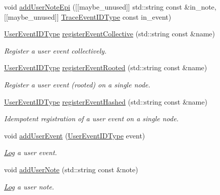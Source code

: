 \begin{DoxyCompactItemize}
\item 
void \hyperlink{namespacevt_1_1trace_adf857bfe26769050d0a5d484bfac2c37}{add\+User\+Note\+Epi} (\mbox{[}\mbox{[}maybe\+\_\+unused\mbox{]}\mbox{]} std\+::string const \&in\+\_\+note, \mbox{[}\mbox{[}maybe\+\_\+unused\mbox{]}\mbox{]} \hyperlink{namespacevt_1_1trace_a64a7185f3e102df8d8258f263ccd1582}{Trace\+Event\+I\+D\+Type} const in\+\_\+event)
\item 
\hyperlink{namespacevt_1_1trace_a5908920d051c144c89f17c69ed262350}{User\+Event\+I\+D\+Type} \hyperlink{namespacevt_1_1trace_a91e24c3e4f4145f8178050065befeda6}{register\+Event\+Collective} (std\+::string const \&name)
\begin{DoxyCompactList}\small\item\em Register a user event collectively. \end{DoxyCompactList}\item 
\hyperlink{namespacevt_1_1trace_a5908920d051c144c89f17c69ed262350}{User\+Event\+I\+D\+Type} \hyperlink{namespacevt_1_1trace_ab2627c07d28361b471d0b9008de2f20c}{register\+Event\+Rooted} (std\+::string const \&name)
\begin{DoxyCompactList}\small\item\em Register a user event (rooted) on a single node. \end{DoxyCompactList}\item 
\hyperlink{namespacevt_1_1trace_a5908920d051c144c89f17c69ed262350}{User\+Event\+I\+D\+Type} \hyperlink{namespacevt_1_1trace_a9d0309860e6216c541fe5c3af74a5426}{register\+Event\+Hashed} (std\+::string const \&name)
\begin{DoxyCompactList}\small\item\em Idempotent registration of a user event on a single node. \end{DoxyCompactList}\item 
void \hyperlink{namespacevt_1_1trace_ac973a9573bd3cc0a3fead674a4551ac5}{add\+User\+Event} (\hyperlink{namespacevt_1_1trace_a5908920d051c144c89f17c69ed262350}{User\+Event\+I\+D\+Type} event)
\begin{DoxyCompactList}\small\item\em \hyperlink{structvt_1_1trace_1_1_log}{Log} a user event. \end{DoxyCompactList}\item 
void \hyperlink{namespacevt_1_1trace_a40f3744bfeb2281ce300d12271f3d48c}{add\+User\+Note} (std\+::string const \&note)
\begin{DoxyCompactList}\small\item\em \hyperlink{structvt_1_1trace_1_1_log}{Log} a user note. \end{DoxyCompactList}\item 

\end{DoxyCompactItemize}
